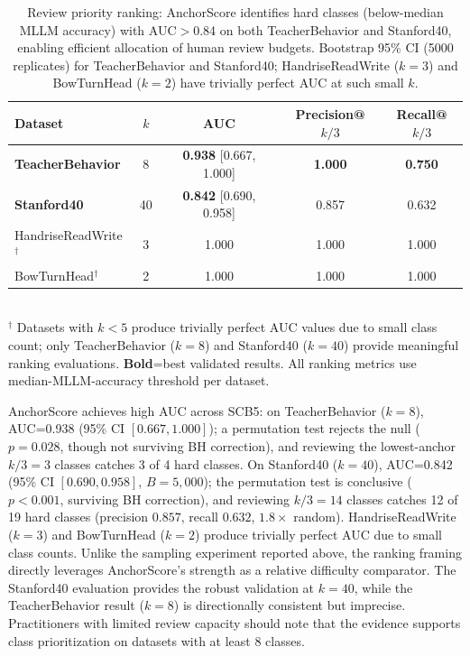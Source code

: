 \documentclass[11pt,a4paper]{article}
\begin{document}
\begin{table}[t]
\caption{Review priority ranking: AnchorScore identifies hard classes (below-median MLLM accuracy) with AUC$>$0.84 on both TeacherBehavior and Stanford40, enabling efficient allocation of human review budgets. Bootstrap 95\% CI (5000 replicates) for TeacherBehavior and Stanford40; HandriseReadWrite ($k=3$) and BowTurnHead ($k=2$) have trivially perfect AUC at such small $k$.}
\label{tab:ranking}
\centering
\footnotesize
\begin{tabular}{lcccc}
\toprule
\textbf{Dataset} & $k$ & \textbf{AUC} & \textbf{Precision@$k/3$} & \textbf{Recall@$k/3$} \\
\midrule
\textbf{TeacherBehavior} & 8 & \textbf{0.938} [0.667, 1.000] & \textbf{1.000} & \textbf{0.750} \\
\textbf{Stanford40} & 40 & \textbf{0.842} [0.690, 0.958] & 0.857 & 0.632 \\
HandriseReadWrite$^\dagger$ & 3 & 1.000 & 1.000 & 1.000 \\
BowTurnHead$^\dagger$ & 2 & 1.000 & 1.000 & 1.000 \\
\bottomrule
\end{tabular}
\\[4pt]
\footnotesize{$^\dagger$ Datasets with $k<5$ produce trivially perfect AUC values due to small class count; only TeacherBehavior ($k=8$) and Stanford40 ($k=40$) provide meaningful ranking evaluations. \textbf{Bold}=best validated results. All ranking metrics use median-MLLM-accuracy threshold per dataset.}
\end{table}

AnchorScore achieves high AUC across SCB5: on TeacherBehavior ($k=8$), AUC=0.938 (95\% CI $[0.667, 1.000]$); a permutation test rejects the null ($p=0.028$, though not surviving BH correction), and reviewing the lowest-anchor $k/3=3$ classes catches 3 of 4 hard classes. On Stanford40 ($k=40$), AUC=0.842 (95\% CI $[0.690, 0.958]$, $B=5{,}000$); the permutation test is conclusive ($p<0.001$, surviving BH correction), and reviewing $k/3=14$ classes catches 12 of 19 hard classes (precision $0.857$, recall $0.632$, $1.8\times$ random). HandriseReadWrite ($k=3$) and BowTurnHead ($k=2$) produce trivially perfect AUC due to small class counts.
Unlike the sampling experiment reported above, the ranking framing directly leverages AnchorScore's strength as a relative difficulty comparator. The Stanford40 evaluation provides the robust validation at $k=40$, while the TeacherBehavior result ($k=8$) is directionally consistent but imprecise. Practitioners with limited review capacity should note that the evidence supports class prioritization on datasets with at least 8 classes.
\end{document}
